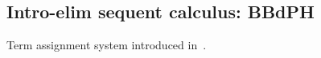 
\subsection{Intro-elim sequent calculus: BBdPH}

Term assignment system introduced in~\cite{BBdPH93}.
